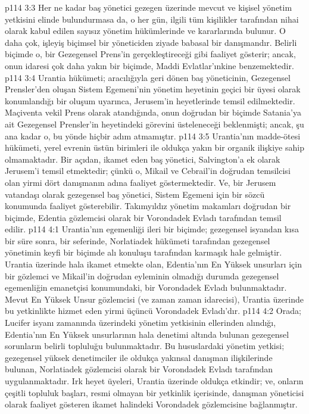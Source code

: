 \vs p114 3:3 Her ne kadar baş yönetici gezegen üzerinde mevcut ve kişisel yönetim yetkisini elinde bulundurmasa da, o her gün, ilgili tüm kişilikler tarafından nihai olarak kabul edilen sayısız yönetim hükümlerinde ve kararlarında bulunur. O daha çok, işleyiş biçimsel bir yöneticiden ziyade babasal bir danışmandır. Belirli biçimde o, bir Gezegensel Prens’in gerçekleştireceği gibi faaliyet gösterir; ancak, onun idaresi çok daha yakın bir biçimde, Maddi Evlatlar’ınkine benzemektedir.
\vs p114 3:4 Urantia hükümeti; aracılığıyla geri dönen baş yöneticinin, Gezegensel Prensler’den oluşan Sistem Egemeni’nin yönetim heyetinin geçici bir üyesi olarak konumlandığı bir oluşum uyarınca, Jerusem’in heyetlerinde temsil edilmektedir. Maçiventa vekil Prens olarak atandığında, onun doğrudan bir biçimde Satania’ya ait Gezegensel Prensler’in heyetindeki görevini üsteleneceği beklenmişti; ancak, şu ana kadar o, bu yönde hiçbir adım atmamıştır.
\vs p114 3:5 Urantia’nın madde\hyp{}ötesi hükümeti, yerel evrenin üstün birimleri ile oldukça yakın bir organik ilişkiye sahip olmamaktadır. Bir açıdan, ikamet eden baş yönetici, Salvington’a ek olarak Jerusem’i temsil etmektedir; çünkü o, Mikail ve Cebrail’in doğrudan temsilcisi olan yirmi dört danışmanın adına faaliyet göstermektedir. Ve, bir Jerusem vatandaşı olarak gezegensel baş yönetici, Sistem Egemeni için bir sözcü konumunda faaliyet gösterebilir. Takımyıldız yönetim makamları doğrudan bir biçimde, Edentia gözlemcisi olarak bir Vorondadek Evladı tarafından temsil edilir.
\vs p114 4:1 Urantia’nın egemenliği ileri bir biçimde; gezegensel isyandan kısa bir süre sonra, bir seferinde, Norlatiadek hükümeti tarafından gezegensel yönetimin keyfi bir biçimde alı konuluşu tarafından karmaşık hale gelmiştir. Urantia üzerinde hala ikamet etmekte olan, Edentia’nın En Yüksek unsurları için bir gözlemci ve Mikail’in doğrudan eyleminin olmadığı durumda gezegensel egemenliğin emanetçisi konumundaki, bir Vorondadek Evladı bulunmaktadır. Mevut En Yüksek Unsur gözlemcisi (ve zaman zaman idarecisi), Urantia üzerinde bu yetkinlikte hizmet eden yirmi üçüncü Vorondadek Evladı’dır.
\vs p114 4:2 Orada; Lucifer isyanı zamanında üzerindeki yönetim yetkisinin ellerinden alındığı, Edentia’nın En Yüksek unsurlarının hala denetimi altında bulunan gezegensel sorunların belirli topluluğu bulunmaktadır. Bu hususlardaki yönetim yetkisi; gezegensel yüksek denetimciler ile oldukça yakınsal danışman ilişkilerinde bulunan, Norlatiadek gözlemcisi olarak bir Vorondadek Evladı tarafından uygulanmaktadır. Irk heyet üyeleri, Urantia üzerinde oldukça etkindir; ve, onların çeşitli topluluk başları, resmi olmayan bir yetkinlik içerisinde, danışman yöneticisi olarak faaliyet gösteren ikamet halindeki Vorondadek gözlemcisine bağlanmıştır.
